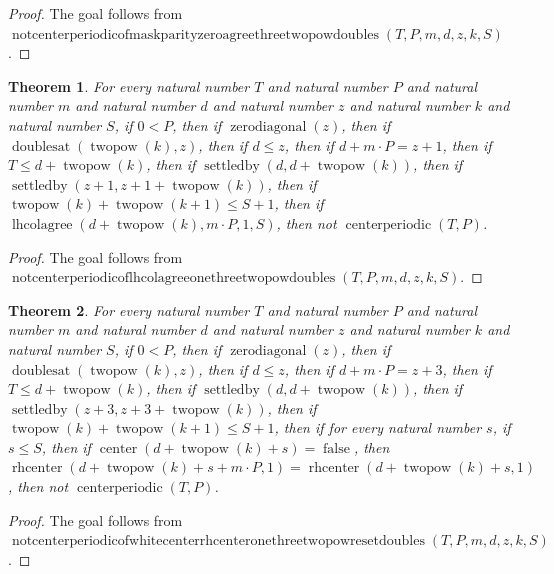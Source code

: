 \documentclass[11pt]{article}
\newtheorem{theorem}{Theorem}[section]
\theoremstyle{definition}
\begin{document}
\begin{proof}
The goal follows from \(\operatorname{notcenterperiodicofmaskparityzeroagreethreetwopowdoubles}(T, P, m, d, z, k, S)\).
\end{proof}
\begin{theorem}
\label{ll:paper:not-centerperiodic-of-lhcolagree-one-three-twopow-doubles}
For every natural number \(T\) and natural number \(P\) and natural number \(m\) and natural number \(d\) and natural number \(z\) and natural number \(k\) and natural number \(S\), if \(0 < P\), then if \(\operatorname{zerodiagonal}(z)\), then if \(\operatorname{doublesat}(\operatorname{twopow}(k), z)\), then if \(d \le z\), then if \(d + m \cdot P = z + 1\), then if \(T \le d + \operatorname{twopow}(k)\), then if \(\operatorname{settledby}(d, d + \operatorname{twopow}(k))\), then if \(\operatorname{settledby}(z + 1, z + 1 + \operatorname{twopow}(k))\), then if \(\operatorname{twopow}(k) + \operatorname{twopow}(k + 1) \le S + 1\), then if \(\operatorname{lhcolagree}(d + \operatorname{twopow}(k), m \cdot P, 1, S)\), then not \(\operatorname{centerperiodic}(T, P)\).
\end{theorem}
\begin{proof}
The goal follows from \(\operatorname{notcenterperiodicoflhcolagreeonethreetwopowdoubles}(T, P, m, d, z, k, S)\).
\end{proof}
\begin{theorem}
\label{ll:paper:not-centerperiodic-of-white-center-rhcenter-one-three-twopow-reset-doubles}
For every natural number \(T\) and natural number \(P\) and natural number \(m\) and natural number \(d\) and natural number \(z\) and natural number \(k\) and natural number \(S\), if \(0 < P\), then if \(\operatorname{zerodiagonal}(z)\), then if \(\operatorname{doublesat}(\operatorname{twopow}(k), z)\), then if \(d \le z\), then if \(d + m \cdot P = z + 3\), then if \(T \le d + \operatorname{twopow}(k)\), then if \(\operatorname{settledby}(d, d + \operatorname{twopow}(k))\), then if \(\operatorname{settledby}(z + 3, z + 3 + \operatorname{twopow}(k))\), then if \(\operatorname{twopow}(k) + \operatorname{twopow}(k + 1) \le S + 1\), then if for every natural number \(s\), if \(s \le S\), then if \(\operatorname{center}(d + \operatorname{twopow}(k) + s) = \operatorname{false}\), then \(\operatorname{rhcenter}(d + \operatorname{twopow}(k) + s + m \cdot P, 1) = \operatorname{rhcenter}(d + \operatorname{twopow}(k) + s, 1)\), then not \(\operatorname{centerperiodic}(T, P)\).
\end{theorem}
\begin{proof}
The goal follows from \(\operatorname{notcenterperiodicofwhitecenterrhcenteronethreetwopowresetdoubles}(T, P, m, d, z, k, S)\).
\end{proof}
\end{document}
